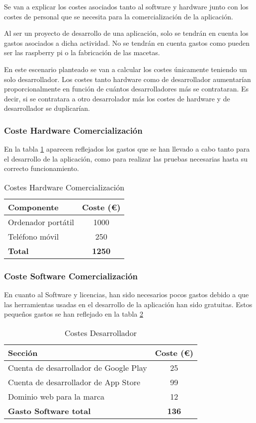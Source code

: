 Se van a explicar los costes asociados tanto al software y hardware junto con los costes de personal que se necesita para la comercialización de la aplicación.

Al ser un proyecto de desarrollo de una aplicación, solo se tendrán en cuenta los gastos asociados a dicha actividad. No se tendrán en cuenta gastos como pueden ser las raspberry pi o la fabricación de las macetas.

En este escenario planteado se van a calcular los costes únicamente teniendo un solo desarrollador. Los costes tanto hardware como de desarrollador aumentarían proporcionalmente en función de cuántos desarrolladores más se contrataran. Es decir, si se contratara a otro desarrolador más los costes de hardware y de desarrollador se duplicarían.

\subsubsection{Coste Hardware Comercialización}
En la tabla \ref{tab:CostosHardwareComer} aparecen reflejados los gastos que se han llevado a cabo tanto para el desarrollo de la aplicación, como para realizar las pruebas necesarias hasta su correcto funcionamiento.

\begin{table}[H]
\centering
\begin{tabular}{|l|c|}
\hline
\textbf{Componente} & \textbf{Coste (€)} \\ \hline
Ordenador portátil & 1000 \\ \hline
Teléfono móvil & 250 \\ \hline
\textbf{Total} & \textbf{1250} \\ \hline
\end{tabular}
\caption{Costes Hardware Comercialización}
\label{tab:CostosHardwareComer}
\end{table}


\subsubsection{Coste Software Comercialización}
En cuanto al Software y licencias, han sido necesarios pocos gastos debido a que las herramientas usadas en el desarrollo de la aplicación han sido gratuitas.
Estos pequeños gastos se han reflejado en la tabla \ref{tab:CostosSoftwareCom}

\begin{table}[H]
\centering
\begin{tabular}{|l|c|}
\hline
\textbf{Sección} & \textbf{Coste (€)} \\ \hline
Cuenta de desarrollador de Google Play & 25 \\ \hline
Cuenta de desarrollador de App Store & 99  \\ \hline
Dominio web para la marca & 12 \\ \hline
\textbf{Gasto Software total} & \textbf{136} \\ \hline
\end{tabular}
\caption{Costes Desarrollador}
\label{tab:CostosSoftwareCom}
\end{table}



